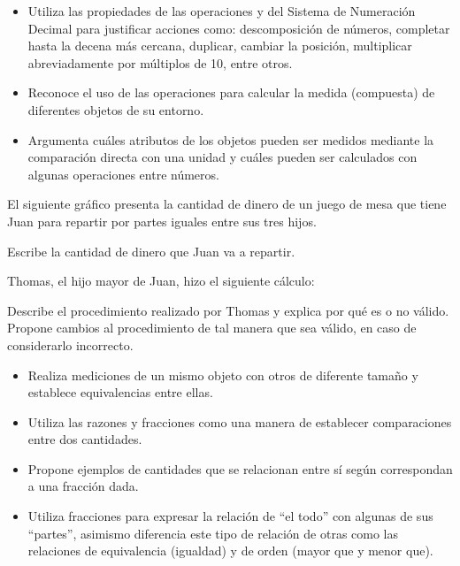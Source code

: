 \begin{itemize}
  \item Utiliza las propiedades de las operaciones y del Sistema de Numeración Decimal para justificar acciones como: descomposición de números, completar hasta la decena más cercana, duplicar, cambiar la posición, multiplicar abreviadamente por múltiplos de 10, entre otros.
  \item Reconoce el uso de las operaciones para calcular la medida (compuesta) de diferentes objetos de su entorno.
  \item Argumenta cuáles atributos de los objetos pueden ser medidos mediante la comparación directa con una unidad y cuáles pueden ser calculados con algunas operaciones entre números.
\end{itemize}

\ejemplo

El siguiente gráfico presenta la cantidad de dinero de un juego de mesa que tiene Juan para repartir por partes iguales entre sus tres hijos.



Escribe la cantidad de dinero que Juan va a repartir.

Thomas, el hijo mayor de Juan, hizo el siguiente cálculo:


Describe el procedimiento realizado por Thomas y explica por qué es o no válido. Propone cambios al procedimiento de tal manera que sea válido, en caso de considerarlo incorrecto.


\evidencias

\begin{itemize}
  \item Realiza mediciones de un mismo objeto con otros de diferente tamaño y establece equivalencias entre ellas.
  \item Utiliza las razones y fracciones como una manera de establecer comparaciones entre dos cantidades.
  \item Propone ejemplos de cantidades que se relacionan entre sí según correspondan a una fracción dada.
  \item Utiliza fracciones para expresar la relación de “el todo” con algunas de sus “partes”, asimismo diferencia este tipo de relación de otras como las relaciones de equivalencia (igualdad) y de orden (mayor que y menor que).
\end{itemize}

